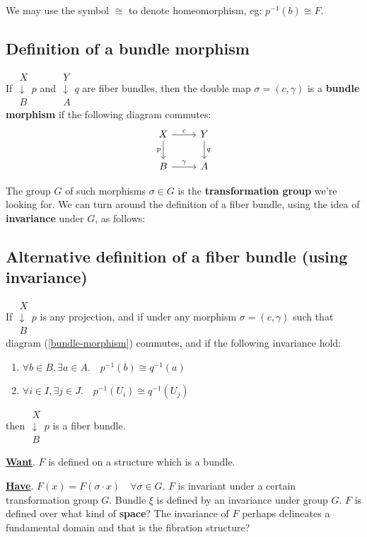 \begin{preview}
\begin{minipage}{\textwidth}
We may use the symbol $\cong$ to denote homeomorphism, eg:  $p^{-1}(b) \cong F$.

\subsection{Definition of a bundle morphism}

If $\mathrel{\substack{X\\\downarrow \\B}  {\scriptstyle p}}$ and $\mathrel{\substack{Y\\\downarrow \\A}  {\scriptstyle q}}$ are fiber bundles, then the double map $\sigma = (c,\gamma)$ is a \textbf{bundle morphism} if the following diagram commutes:
\begin{equation}
\begin{tikzcd}[]
	X \arrow[r,"c"] \arrow[d,"p", swap] & Y \arrow[d,"q"] \\
	B \arrow[r,"\gamma"] & A
\end{tikzcd}
\label{bundle-morphism}
\end{equation}

The group $G$ of such morphisms $\sigma \in G$ is the \textbf{transformation group} we're looking for.  We can turn around the definition of a fiber bundle, using the idea of \textbf{invariance} under $G$, as follows:

\subsection{Alternative definition of a fiber bundle (using invariance)}

If $\mathrel{\substack{X\\\downarrow \\B}  {\scriptstyle p}}$ is any projection, and if under any morphism $\sigma = (c,\gamma)$ such that diagram (\ref{bundle-morphism}) commutes, and if the following invariance hold:

\begin{enumerate}[label=(\roman*)]
	\item $\forall b \in B, \exists a \in A. \quad p^{-1}(b) \cong q^{-1}(a) $
	
	\item $\forall i \in I, \exists j \in J. \quad p^{-1}(U_i) \cong q^{-1}(U_j) $
\end{enumerate}
then $\mathrel{\substack{X\\\downarrow \\B}  {\scriptstyle p}}$ is a fiber bundle.

\textbf{\uline{Want}}.  $F$ is defined on a structure which is a bundle.

\textbf{\uline{Have}}.  $ F(x) = F(\sigma \cdot x) \quad \forall \sigma \in G $. $F$ is invariant under a certain transformation group $G$.  Bundle $\xi$ is defined by an invariance under group $G$.  $F$ is defined over what kind of \textbf{space}?  The invariance of $F$ perhaps delineates a fundamental domain and that is the fibration structure?

\end{minipage}
\end{preview}


